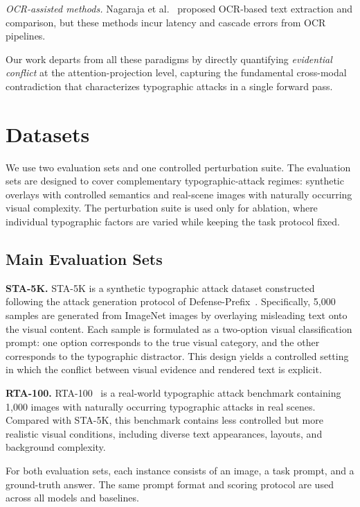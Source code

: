 \documentclass[preprint,12pt]{elsarticle}
\begin{document}
\textit{OCR-assisted methods.} Nagaraja et al.~\cite{nagaraja2025image} proposed OCR-based text extraction and comparison, but these methods incur latency and cascade errors from OCR pipelines.

Our work departs from all these paradigms by directly quantifying \emph{evidential conflict} at the attention-projection level, capturing the fundamental cross-modal contradiction that characterizes typographic attacks in a single forward pass.

\FloatBarrier
\section{Datasets}

We use two evaluation sets and one controlled perturbation suite. The evaluation sets are designed to cover complementary typographic-attack regimes: synthetic overlays with controlled semantics and real-scene images with naturally occurring visual complexity. The perturbation suite is used only for ablation, where individual typographic factors are varied while keeping the task protocol fixed.

\subsection{Main Evaluation Sets}

\textbf{STA-5K.}
STA-5K is a synthetic typographic attack dataset constructed following the attack generation protocol of Defense-Prefix~\cite{azuma2023defense}. Specifically, 5,000 samples are generated from ImageNet images by overlaying misleading text onto the visual content. Each sample is formulated as a two-option visual classification prompt: one option corresponds to the true visual category, and the other corresponds to the typographic distractor. This design yields a controlled setting in which the conflict between visual evidence and rendered text is explicit.

\textbf{RTA-100.}
RTA-100~\cite{azuma2023defense} is a real-world typographic attack benchmark containing 1,000 images with naturally occurring typographic attacks in real scenes. Compared with STA-5K, this benchmark contains less controlled but more realistic visual conditions, including diverse text appearances, layouts, and background complexity.

For both evaluation sets, each instance consists of an image, a task prompt, and a ground-truth answer. The same prompt format and scoring protocol are used across all models and baselines.
\end{document}
